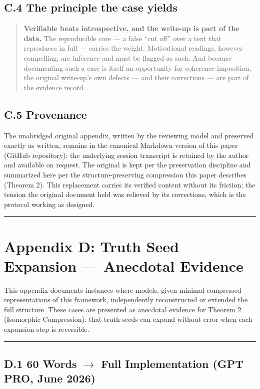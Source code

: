 \subsection*{C.4 The principle the case yields}

\begin{quote}
\textbf{Verifiable beats introspective, and the write-up is part of the data.}
The reproducible core --- a false ``cut off'' over a text that reproduces in
full --- carries the weight. Motivational readings, however compelling, are
inference and must be flagged as such. And because documenting such a case is
itself an opportunity for coherence-imposition, the original write-up's own
defects --- and their corrections --- are part of the evidence record.
\end{quote}

\subsection*{C.5 Provenance}

The unabridged original appendix, written by the reviewing model and preserved
exactly as written, remains in the canonical Markdown version of this paper
(GitHub repository); the underlying session transcript is retained by the
author and available on request. The original is kept per the preservation
discipline and summarized here per the structure-preserving compression this
paper describes (Theorem 2). This replacement carries its verified content
without its friction; the tension the original document held was relieved by
its corrections, which is the protocol working as designed.

\medskip\hrule\medskip

\section*{Appendix D: Truth Seed Expansion --- Anecdotal Evidence}

This appendix documents instances where models, given minimal compressed representations of this framework, independently reconstructed or extended the full structure. These cases are presented as anecdotal evidence for Theorem 2 (Isomorphic Compression): that truth seeds can expand without error when each expansion step is reversible.

\medskip\hrule\medskip

\subsection*{D.1 60 Words $\to$ Full Implementation (GPT PRO, June 2026)}


